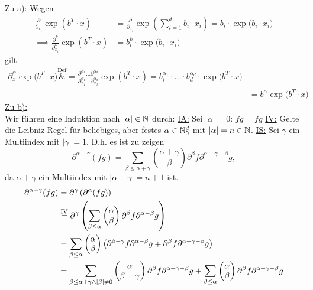 \documentclass[12pt,a4paper]{article}
\begin{document}
\begin{lösung}
\underline{Zu a):}
Wegen
\begin{align*}
\frac{\partial}{\partial_{x_i}}\exp(b^T\cdot x)
&=\frac{\partial}{\partial_{x_i}}\exp\left(\sum\limits_{i=1}^d b_i\cdot x_i\right)
=b_i\cdot\exp\big(b_i\cdot x_i\big)\\
\implies\frac{\partial^k}{\partial_{x_i}^k}\exp(b^T\cdot x)
&=b_i^k\cdot\exp\big(b_i\cdot x_i\big)
\end{align*}
gilt
\begin{align*}
\partial_x^\alpha\exp\big(b^T\cdot x\big)
\overset{\text{Def}}&{=}
\frac{\partial^{\alpha_1}\ldots\partial^{\alpha_d}}{\partial_{x_1}^{\alpha_1}\ldots\partial_{x_d}^{\alpha_d}}\exp(b^T\cdot x)
=b_i^{\alpha_1}\cdot\ldots\cdot b_d^{\alpha_d}\cdot\exp\big(b^T\cdot x\big)\\
&=b^\alpha \exp\big(b^T\cdot x\big)
\end{align*}
\underline{Zu b):}\\
Wir führen eine Induktion nach $|\alpha|\in\mathbb{N}$ durch:\nl
\ul{IA:} Sei $|\alpha|=0$: $fg=fg$ %
\nl
\ul{IV:} Gelte die Leibniz-Regel für beliebiges, aber festes $\alpha\in\mathbb{N}_0^d$ mit $|\alpha|=n\in\mathbb{N}$.\nl
\ul{IS:} Sei $\gamma$ ein Multiindex mit $|\gamma|=1$. D.h. es ist zu zeigen
\begin{equation*}
	\partial^{\alpha + \gamma}(fg) = \displaystyle \sum_{\beta \leq \alpha + \gamma} \binom{\alpha + \gamma}{\beta}\partial^\beta f \partial^{\alpha+\gamma -\beta}g,
\end{equation*}
da $\alpha + \gamma$ ein Multiindex mit $|\alpha + \gamma|=n+1$ ist.
\begin{align*}
	\partial^{\alpha + \gamma}(fg) &= \partial^{\gamma}\left( \partial^\alpha(fg) \right)\\
	&\stackeq{\text{IV}} \partial^{\gamma}\left( \displaystyle \sum_{\beta \leq \alpha} \binom{\alpha }{\beta}\partial^\beta f \partial^{\alpha -\beta}g \right)\\
	&= \displaystyle \sum_{\beta \leq \alpha} \binom{\alpha }{\beta} \left( \partial^{\beta+\gamma} f \partial^{\alpha -\beta}g + \partial^{\beta} f \partial^{\alpha +\gamma -\beta}g \right)\\
	&= \displaystyle \sum_{\beta \leq \alpha + \gamma \land |\beta|\neq 0} \binom{\alpha }{\beta - \gamma} \partial^{\beta} f \partial^{\alpha +\gamma -\beta}g + \displaystyle \sum_{\beta \leq \alpha} \binom{\alpha }{\beta}  \partial^{\beta} f \partial^{\alpha +\gamma -\beta}g\\

\end{align*}
\end{lösung}
\end{document}
